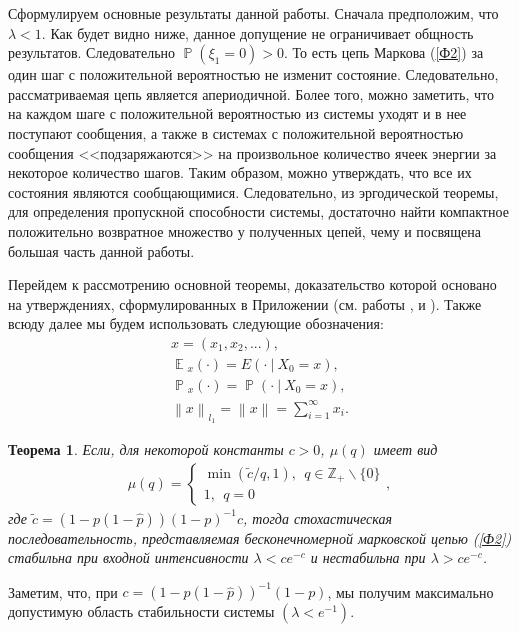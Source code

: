\documentclass[10pt, reqno]{amsart}
\newtheorem*{theorem*}{Теорема}
\newcommand{\norm}[1]{\left\lVert#1\right\rVert}
\DeclareMathOperator*{\E}{\mathbb{E}}
\DeclareMathOperator*{\Pb}{\mathbb{P}}
\begin{document}
Сформулируем основные результаты данной работы. Сначала предположим, что $\lambda < 1$. Как будет видно ниже, данное допущение не ограничивает общность результатов. Следовательно $\Pb(\xi_{1} = 0) > 0$. То есть цепь Маркова (\ref{Ф2}) за один шаг с положительной вероятностью не изменит состояние. Следовательно, рассматриваемая цепь является апериодичной. Более того, можно заметить, что на каждом шаге с положительной вероятностью из системы уходят и в нее поступают сообщения, а также в системах с положительной вероятностью сообщения <<подзаряжаются>> на произвольное количество ячеек энергии за некоторое количество шагов. Таким образом, можно утверждать, что все их состояния являются сообщающимися. Следовательно, из эргодической теоремы, для определения пропускной способности системы, достаточно найти компактное положительно возвратное множество у полученных цепей, чему и посвящена большая часть данной работы.

Перейдем к рассмотрению основной теоремы, доказательство которой основано на утверждениях, сформулированных в Приложении (см. работы \cite{Foss_original}, \cite{Foss_theorem_for_instability} и \cite{Foss_Konstantinopolous}). Также всюду далее мы будем использовать следующие обозначения:
\begin{gather*}
    x = (x_{1}, x_{2},...),\\
    \E{}_{x}(\cdot) = E(\cdot \:|\: X_{0} = x),\\
    \Pb{}_{x}(\cdot) = \Pb(\cdot \:|\: X_{0} = x),\\
    \norm{x}_{l_{1}} = \norm{x} = \sum_{i=1}^{\infty}x_{i}.
\end{gather*}

\begin{theorem*}
Если, для некоторой константы $c > 0$, $\mu(q)$ имеет вид
\begin{align*}
    \mu(q) = \begin{cases}
    \min(\widetilde{c}/q, 1),\:\:q \in \mathbb{Z}_{+}\backslash\{0\}\\
    1,\:\: q = 0
    \end{cases},
\end{align*}
где $\widetilde{c} = (1 - p(1-\hat{p}))(1-p)^{-1}c$, тогда стохастическая последовательность, представляемая бесконечномерной марковской цепью (\ref{Ф2}) стабильна при входной интенсивности $\lambda < ce^{−c}$ и нестабильна при $\lambda > ce^{−c}$.
\end{theorem*}
Заметим, что, при $c = (1 - p(1-\hat{p}))^{-1}(1-p)$, мы получим максимально допустимую область стабильности системы $(\lambda < e^{-1})$.
\end{document}

